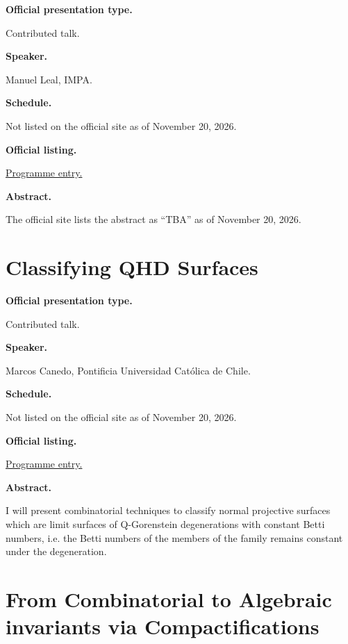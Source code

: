 \medskip\noindent
{\bf Official presentation type.}

Contributed talk.

\medskip\noindent
{\bf Speaker.}

Manuel Leal, IMPA.

\medskip\noindent
{\bf Schedule.}

Not listed on the official site as of
November 20, 2026.

\medskip\noindent
{\bf Official listing.}

\href{%
https://sites.google.com/view/%
geoalgcompluff/legal/%
legal-2027-resumos#h.dant8g3oe5ea%
}{Programme entry.}

\medskip\noindent
{\bf Abstract.}

The official site lists the abstract
as ``TBA'' as of November 20, 2026.

\section{Classifying QHD Surfaces}
\label{section-classifying-qhd-surfaces}

\medskip\noindent
{\bf Official presentation type.}

Contributed talk.

\medskip\noindent
{\bf Speaker.}

Marcos Canedo, Pontificia Universidad
Católica de Chile.

\medskip\noindent
{\bf Schedule.}

Not listed on the official site as of
November 20, 2026.

\medskip\noindent
{\bf Official listing.}

\href{%
https://sites.google.com/view/%
geoalgcompluff/legal/%
legal-2027-resumos#h.dant8g3oe5ea%
}{Programme entry.}

\medskip\noindent
{\bf Abstract.}

I will present combinatorial techniques to
classify normal projective surfaces which are
limit surfaces of Q-Gorenstein degenerations
with constant Betti numbers, i.e. the Betti
numbers of the members of the family remains
constant under the degeneration.

\section{From Combinatorial to Algebraic
invariants via Compactifications}
\label{section-from-combinatorial-to}

